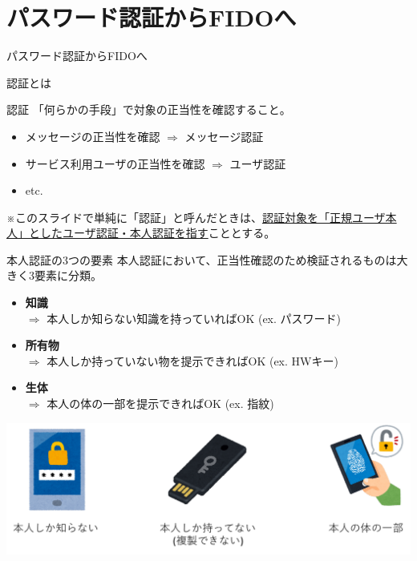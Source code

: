 \documentclass[12pt,dvipdfmx,uplatex]{beamer}
\begin{document}
\section{パスワード認証からFIDOへ}
\begin{frame}
\centering
{\Large パスワード認証からFIDOへ}
\end{frame}

\begin{frame}{認証とは}
\begin{block}{認証}
 「何らかの手段」で\alert{対象の正当性を確認する}こと。
\end{block}
\begin{itemize}
 \item メッセージの正当性を確認 $\Rightarrow$ メッセージ認証
 \item サービス利用ユーザの正当性を確認 $\Rightarrow$ ユーザ認証
 \item etc.
\end{itemize}

\vspace{2ex}

※このスライドで単純に「認証」と呼んだときは、\ul{認証対象を「正規ユーザ本人」としたユーザ認証・本人認証を指す}こととする。
\end{frame}

\begin{frame}{本人認証の3つの要素}
本人認証において、正当性確認のため検証されるものは大きく3要素に分類。
\begin{itemize}
 \item \textbf{知識}\\
$\Rightarrow$ 本人しか知らない知識を持っていればOK (ex. パスワード)
 \item \textbf{所有物}\\
$\Rightarrow$ 本人しか持っていない物を提示できればOK (ex. HWキー)
 \item \textbf{生体}\\
$\Rightarrow$ 本人の体の一部を提示できればOK (ex. 指紋)
\end{itemize}
\begin{center}
\includegraphics[width=0.7\linewidth]{Figs/auth-three-elements.pdf}
\end{center}

\end{frame}
\end{document}
